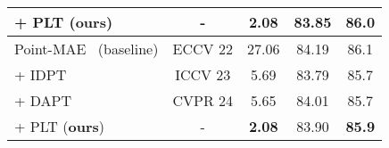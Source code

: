 \begin{table}
\begin{tabular}{lcccc}
    \rowcolor{linecolor!40}+ PLT (\textbf{ours})& - & \textbf{2.08}  & \textbf{83.85} & \textbf{86.0} \\
    \midrule
    Point-MAE~\cite{pang2022masked} (baseline) &  ECCV 22 & 27.06 & 84.19 & 86.1 \\ 
    + IDPT~\cite{zha2023instance} & ICCV 23 & 5.69  & 83.79  & 85.7  \\
    + DAPT~\cite{zhou2024dynamic} & CVPR 24 & 5.65  & 84.01 & 85.7 \\
    \rowcolor{linecolor!40}+ PLT (\textbf{ours})& - & \textbf{2.08}  & 83.90 & \textbf{85.9} \\
    \bottomrule
    \end{tabular}
  \label{tab:segmentation}
\end{table}